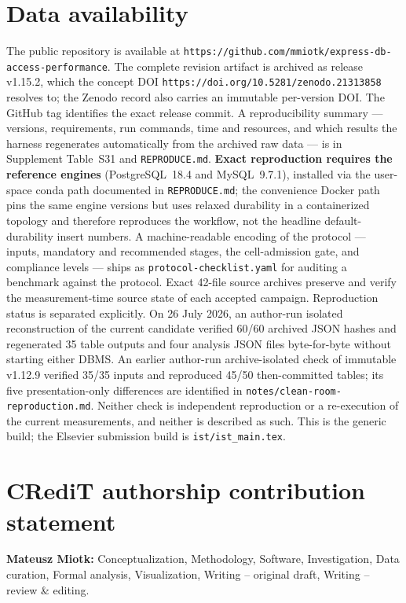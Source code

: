 \documentclass[12pt,a4paper]{article}
\begin{document}








\section*{Data availability}
The public repository is available at \texttt{https://github.com/mmiotk/express-db-access-performance}. The complete revision artifact is archived as release v1.15.2, which the concept DOI \texttt{https://doi.org/10.5281/zenodo.21313858} resolves to; the Zenodo record also carries an immutable per-version DOI. The GitHub tag identifies the exact release commit. A reproducibility summary --- versions,
requirements, run commands, time and resources, and which results the harness regenerates
automatically from the archived raw data --- is in Supplement Table~S31 and
\texttt{REPRODUCE.md}. \textbf{Exact reproduction requires the reference engines}
(PostgreSQL~18.4 and MySQL~9.7.1), installed via the user-space conda path documented in
\texttt{REPRODUCE.md}; the convenience Docker path pins the same engine versions but uses relaxed durability in a containerized topology and therefore reproduces the workflow, not the headline default-durability insert numbers. A machine-readable
encoding of the protocol --- inputs, mandatory and recommended stages, the cell-admission gate, and
compliance levels --- ships as \texttt{protocol-checklist.yaml} for auditing a benchmark against the
protocol. Exact 42-file source archives preserve and verify the measurement-time
source state of each accepted campaign. Reproduction status is separated explicitly. On 26 July 2026, an author-run isolated reconstruction of the current candidate verified 60/60 archived JSON hashes and regenerated 35 table outputs and four analysis JSON files byte-for-byte without starting either DBMS. An earlier author-run archive-isolated check of immutable v1.12.9 verified 35/35 inputs and reproduced 45/50 then-committed tables; its five presentation-only differences are identified in \texttt{notes/clean-room-reproduction.md}. Neither check is independent reproduction or a re-execution of the current measurements, and neither is described as such. This is the generic build; the Elsevier submission build is
\texttt{ist/ist\_main.tex}.

\section*{CRediT authorship contribution statement}
\textbf{Mateusz Miotk:} Conceptualization, Methodology, Software, Investigation,
Data curation, Formal analysis, Visualization, Writing -- original draft,
Writing -- review \& editing.
\end{document}
